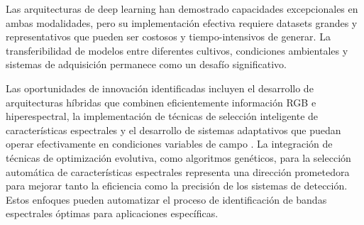 \vspace{5mm}

Las arquitecturas de deep learning han demostrado capacidades excepcionales en ambas modalidades, pero su implementación efectiva requiere datasets grandes y representativos que pueden ser costosos y tiempo-intensivos de generar. La transferibilidad de modelos entre diferentes cultivos, condiciones ambientales y sistemas de adquisición permanece como un desafío significativo.

Las oportunidades de innovación identificadas incluyen el desarrollo de arquitecturas híbridas que combinen eficientemente información RGB e hiperespectral, la implementación de técnicas de selección inteligente de características espectrales y el desarrollo de sistemas adaptativos que puedan operar efectivamente en condiciones variables de campo \cite{WIEME2022156}. La integración de técnicas de optimización evolutiva, como algoritmos genéticos, para la selección automática de características espectrales representa una dirección prometedora para mejorar tanto la eficiencia como la precisión de los sistemas de detección. Estos enfoques pueden automatizar el proceso de identificación de bandas espectrales óptimas para aplicaciones específicas.